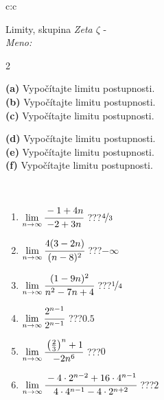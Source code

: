 \documentclass[10pt]{report}
\begin{document}
\newpage
\thispagestyle{empty}
\begin{tabular}{c:c}
\begin{minipage}[c][104.5mm][t]{0.5\linewidth}
\begin{center}
\vspace{5mm}
{\huge Limity, skupina \textit{Zeta $\zeta$} -}\\[5mm]
\textit{Meno:}\phantom{xxxxxxxxxxxxxxxxxxxxxxxxxxxxxxxxxxxxxxxxxxxxxxxxxxxxxxxxxxxxxxxxx}\\[5mm]
\begin{minipage}{0.95\linewidth}
\begin{center}
{\small \begin{multicols}{2} \raggedright
\textbf{(a)} Vypočítajte limitu postupnosti. \\[1mm]
\textbf{(b)} Vypočítajte limitu postupnosti. \\[1mm]
\textbf{(c)} Vypočítajte limitu postupnosti. \par \columnbreak
\textbf{(d)} Vypočítajte limitu postupnosti. \\[1mm]
\textbf{(e)} Vypočítajte limitu postupnosti. \\[1mm]
\textbf{(f)} Vypočítajte limitu postupnosti.
\end{multicols}
}
\end{center}
\end{minipage}
\\[1mm]
\begin{minipage}{0.79\linewidth}
\begin{center}
\begin{varwidth}{\linewidth}
\setlength{\itemsep}{0pt}
\begin{enumerate}
\footnotesizerr
\item $\lim\limits_{n\to\infty}\cfrac{-1+4n}{-2+3n}$\quad \dotfill\; ???\;\dotfill \quad $\nicefrac{4}{3}$
\item $\lim\limits_{n\to\infty}\cfrac{4(3-2n)}{(n-8)^2}$\quad \dotfill\; ???\;\dotfill \quad $-\infty$
\item $\lim\limits_{n\to\infty}\cfrac{(1-9n)^2}{n^2-7n+4}$\quad \dotfill\; ???\;\dotfill \quad $\nicefrac{1}{4}$
\item $\lim\limits_{n\to\infty}\cfrac{2^{n-1}}{2^{n-1}}$\quad \dotfill\; ???\;\dotfill \quad $0.5$
\item $\lim\limits_{n\to\infty}\cfrac{\left(\frac{2}{3}\right)^n +1}{-2n^{6}}$\quad \dotfill\; ???\;\dotfill \quad $0$
\item $\lim\limits_{n\to\infty}\cfrac{-4\cdot 2^{n-2}+16\cdot 4^{n-1}}{4\cdot 4^{n-1}-4\cdot 2^{n+2}}$\quad \dotfill\; ???\;\dotfill \quad $2$

\end{enumerate}
\end{varwidth}
\end{center}
\end{minipage}
\end{center}
\end{minipage}
\end{tabular}
\end{document}
